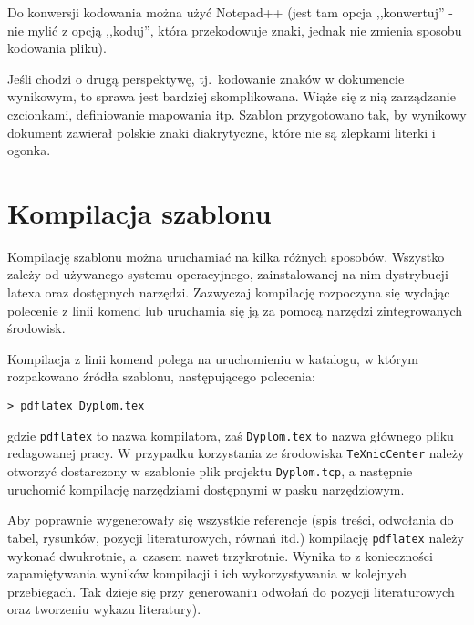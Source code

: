 Do konwersji kodowania można użyć Notepad++ (jest tam opcja ,,konwertuj'' - nie mylić z opcją ,,koduj'', która przekodowuje znaki, jednak nie zmienia sposobu kodowania pliku).

Jeśli chodzi o drugą perspektywę, tj.\ kodowanie znaków w dokumencie wynikowym, to sprawa jest bardziej skomplikowana. Wiąże się z nią zarządzanie czcionkami, definiowanie mapowania itp. Szablon przygotowano tak, by wynikowy dokument zawierał polskie znaki diakrytyczne, które nie są zlepkami literki i ogonka.

\section{Kompilacja szablonu}
Kompilację szablonu można uruchamiać na kilka różnych sposobów. Wszystko zależy od używanego systemu operacyjnego, zainstalowanej na nim dystrybucji latexa oraz dostępnych narzędzi. Zazwyczaj kompilację rozpoczyna się wydając polecenie z linii komend lub uruchamia się ją za pomocą narzędzi zintegrowanych środowisk.

Kompilacja z linii komend polega na uruchomieniu w katalogu, w którym rozpakowano źródła szablonu, następującego polecenia:
\begin{lstlisting}[basicstyle=\ttfamily]
> pdflatex Dyplom.tex
\end{lstlisting}
gdzie \texttt{pdflatex} to nazwa kompilatora, zaś \texttt{Dyplom.tex} to nazwa głównego pliku redagowanej pracy. 
W przypadku korzystania ze środowiska \texttt{TeXnicCenter} należy otworzyć dostarczony w szablonie plik projektu \texttt{Dyplom.tcp}, a następnie uruchomić kompilację narzędziami dostępnymi w pasku narzędziowym.

Aby poprawnie wygenerowały się wszystkie referencje (spis treści, odwołania do tabel, rysunków, pozycji literaturowych, równań itd.) kompilację \texttt{pdflatex} należy wykonać dwukrotnie, a~czasem nawet trzykrotnie. Wynika to z konieczności zapamiętywania wyników kompilacji i ich wykorzystywania w kolejnych przebiegach. Tak dzieje się przy generowaniu odwołań do pozycji literaturowych oraz tworzeniu wykazu literatury). 

